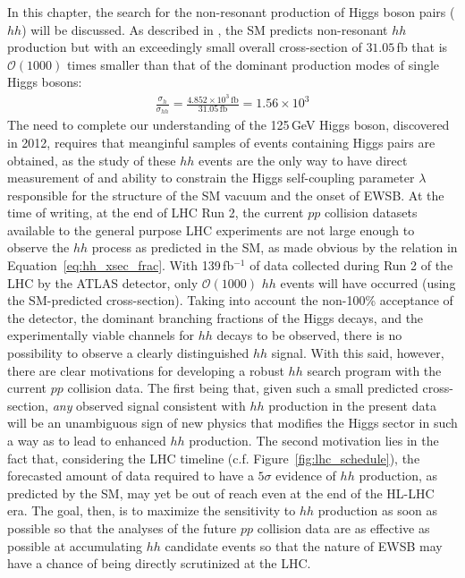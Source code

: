 In this chapter, the search for the non-resonant production of Higgs boson pairs ($hh$) will be discussed.
As described in {\color{red}{Section XXX}}, the SM predicts non-resonant $hh$ production but with
an exceedingly small overall cross-section of $31.05$\,fb that is $\mathcal{O}(1000)$ times smaller
than that of the dominant production modes of single Higgs bosons:
\begin{align}
    \frac{\sigma_h}{\sigma_{hh}} = \frac{ 4.852 \times 10^3\,\mathrm{fb}}{31.05\,\mathrm{fb}} = 1.56 \times 10^3
    \label{eq:hh_xsec_frac}
\end{align}
The need to complete our understanding of the 125\,GeV Higgs boson, discovered in 2012, requires
that meanginful samples of events containing Higgs pairs are obtained, as the study of these $hh$
events are the only way to have direct measurement of and ability to constrain the Higgs self-coupling parameter $\lambda$
responsible for the structure of the SM vacuum and the onset of EWSB.
At the time of writing, at the end of LHC Run 2, the current $pp$ collision datasets available to the
general purpose LHC experiments are not large enough to observe the $hh$ process as predicted in the SM,
as made obvious by the relation in  Equation~\ref{eq:hh_xsec_frac}.
With 139\,fb$^{-1}$ of data collected during Run 2 of the LHC by the ATLAS detector,
only $\mathcal{O}(1000)$ $hh$ events will have occurred (using the SM-predicted cross-section).
Taking into account the non-100\% acceptance of the detector, the dominant branching fractions
of the Higgs decays, and the experimentally viable channels for $hh$ decays to be observed,
there is no possibility to observe a clearly distinguished $hh$ signal.
With this said, however, there are clear motivations for developing a robust $hh$ search program with the
current $pp$ collision data.
The first being that, given such a small predicted cross-section, \textit{any} observed signal consistent
with $hh$ production in the present data will be an unambiguous sign of new physics
that modifies the Higgs sector in such a way as to lead to enhanced $hh$ production.
The second motivation lies in the fact that, considering the LHC timeline (c.f. Figure~\ref{fig:lhc_schedule}), the
forecasted amount of data required to have a $5\sigma$ evidence of $hh$ production, as predicted by the SM,
may yet be out of reach even at the end of the HL-LHC era.
The goal, then, is to maximize the sensitivity to $hh$ production as soon as possible so that
the analyses of the future $pp$ collision data are as effective as possible at accumulating $hh$
candidate events so that the nature of EWSB may have a chance of being directly scrutinized at the LHC.

